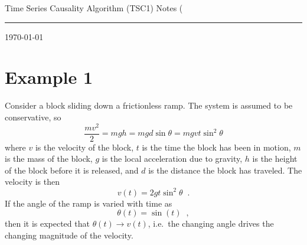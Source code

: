 \documentclass[a4paper,11pt]{article}
\begin{document}
{\Huge Time Series Causality Algorithm (TSC1) Notes}
(
\hfill\rule{150mm}{.1pt}

\hfill{\small \today}

\section{Example 1}
Consider a block sliding down a frictionless ramp.  The system is assumed to be conservative, so
$$
\frac{mv^2}{2} = mgh = mg d\sin\theta = mg vt\sin^2 \theta
$$
where $v$ is the velocity of the block, $t$ is the time the block has been in motion, $m$ is the mass of the block, $g$ is the local acceleration due to gravity, $h$ is the height of the block before it is released, and $d$ is the distance the block has traveled.  The velocity is then  
$$
v(t) = 2gt\sin^2 \theta\;\;.
$$
If the angle of the ramp is varied with time as
$$
\theta(t) = \sin(t)\;\;,
$$
then it is expected that $\theta(t)\rightarrow v(t)$, i.e.\ the changing angle drives the changing magnitude of the velocity.
\end{document}
